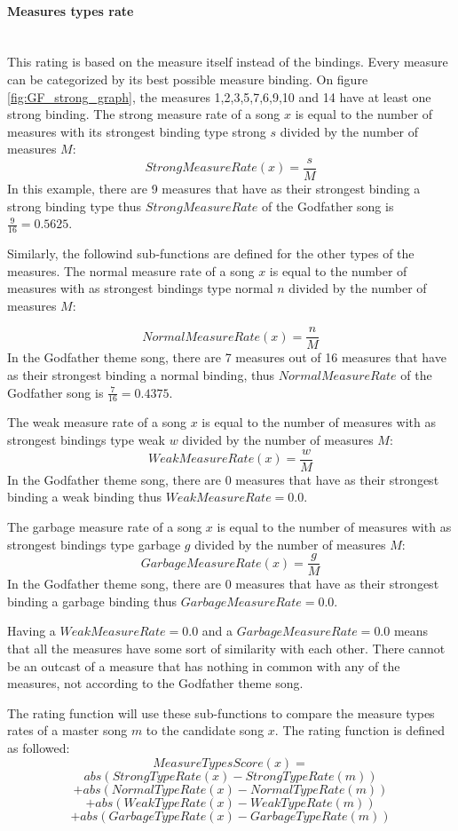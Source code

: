 \paragraph{Measures types rate}\mbox{}\\ \label{sec:measure_type}
This rating is based on the measure itself instead of the bindings. Every measure can be categorized by its best possible measure binding. On figure \ref{fig:GF_strong_graph}, the measures 1,2,3,5,7,6,9,10 and 14 have at least one strong binding. The strong measure rate of a song $x$ is equal to the number of measures with its strongest binding type strong $s$ divided by the number of measures $M$:
\[ StrongMeasureRate(x) = \frac{\textit{s}}{\textit{M} } \]
In this example, there are 9 measures that have as their strongest binding a strong binding type thus $StrongMeasureRate$ of the Godfather song is $\frac{9}{16} =  0.5625$.

Similarly, the followind sub-functions are defined for the other types of the measures. The normal measure rate of a song $x$ is equal to the number of measures with as strongest bindings type normal $n$ divided by the number of measures $M$:

\[ NormalMeasureRate(x) = \frac{\textit{n}}{\textit{M} } \]
In the Godfather theme song, there are 7 measures out of 16 measures that have as their strongest binding a normal binding, thus $NormalMeasureRate$ of the Godfather song is $\frac{7}{16} =  0.4375$.

The weak measure rate of a song $x$ is equal to the number of measures with as strongest bindings type weak $w$ divided by the number of measures $M$:
\[ WeakMeasureRate(x) = \frac{\textit{w}}{\textit{M} } \]
In the Godfather theme song, there are 0 measures that have as their strongest binding a weak binding thus $WeakMeasureRate =  0.0$.

The garbage measure rate of a song $x$ is equal to the number of measures with as strongest bindings type garbage $g$ divided by the number of measures $M$:
\[ GarbageMeasureRate(x) = \frac{\textit{g}}{\textit{M} } \]
In the Godfather theme song, there are 0 measures that have as their strongest binding a garbage binding thus $GarbageMeasureRate =  0.0$.

Having a $WeakMeasureRate =  0.0$ and a $GarbageMeasureRate =  0.0$ means that all the measures have some sort of similarity with each other. There cannot be an outcast of a measure that has nothing in common with any of the measures, not according to the Godfather theme song. 

The rating function will use these sub-functions to compare the measure types rates of a master song $m$ to the candidate song $x$. The rating function is defined as followed:
\[MeasureTypesScore(x) = \]
\[abs( StrongTypeRate(x) - StrongTypeRate(m)) \]
\[+ abs( NormalTypeRate(x) - NormalTypeRate(m)) \]
\[+ abs( WeakTypeRate(x) - WeakTypeRate(m)) \]
\[+ abs( GarbageTypeRate(x) - GarbageTypeRate(m)) \]